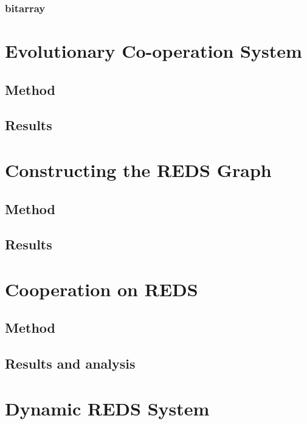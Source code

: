 \documentclass[a4paper, 12pt, notitlepage]{report}
\numberwithin{equation}{subsection}
\theoremstyle{definition}
\theoremstyle{theorem}
\theoremstyle{definition}
\begin{document}
\subsection{bitarray}


\chapter{Evolutionary Co-operation System}


\section{Method}




\section{Results}



\chapter{Constructing the REDS Graph}

\section{Method}

\section{Results}



\chapter{Cooperation on REDS}

\section{Method}

\section{Results and analysis}


\chapter{Dynamic REDS System}
\end{document}

